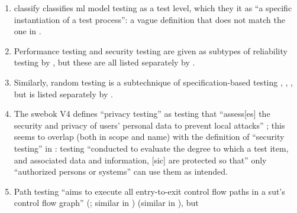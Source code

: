 \begin{enumerate}
    \item %
           \citetISTQB{} \ifnotpaper classify \else classifies \fi
          \acs{ml} model testing as a test level, which \ifnotpaper they \else
              it \fi {} as ``a specific instantiation of a
          test process'': a vague definition that does not match the one in
          .
    \item %
          Performance testing and security testing are given as subtypes of
          reliability testing by \citet{ISO_IEC2023a}, but these are all listed
          separately by \citet[p.~53]{Firesmith2015}.
    \item %
          Similarly, random testing is a subtechnique of specification-based
          testing \ifnotpaper
              \citetext{\citealp[pp.~7, 22]{IEEE2022};
                  \citeyear[pp.~5, 20, Fig.~2]{IEEE2021};
                  \citealp[p.~5\=/12]{SWEBOK2024}; \citealpISTQB{}} \else
              \cite[pp.~7, 22]{IEEE2022}, \cite{ISTQB},
              \cite[p.~5\=/12]{SWEBOK2024}, \cite[pp.~5, 20, Fig.~2]{IEEE2021}
          \fi but is listed
          separately by \citet[p.~46]{Firesmith2015}.
    \item %
          The \acs{swebok} V4 defines ``privacy testing'' as testing that
          ``assess[es] the security and privacy of users' personal data to
          prevent local attacks'' \citep[p.~5-10]{SWEBOK2024}; this seems to
          overlap (both in scope and name) with the definition of ``security
          testing'' in \citep[p.~7]{IEEE2022}: testing
          ``conducted to evaluate the degree to which a test item, and
          associated data and information, [sic] are protected so that'' only
          ``authorized persons or systems'' can use them as intended.
    \item %
          Path testing ``aims to execute all entry-to-exit control flow paths
          in a \acs{sut}'s control flow graph'' \ifnotpaper
              (\citealp[p.~5-13]{SWEBOK2024}; similar in
              \citealp[p.~119]{Patton2006})\else \cite[p.~5-13]{SWEBOK2024}
              (similar in \cite[p.~119]{Patton2006})\fi, but

\end{enumerate}
